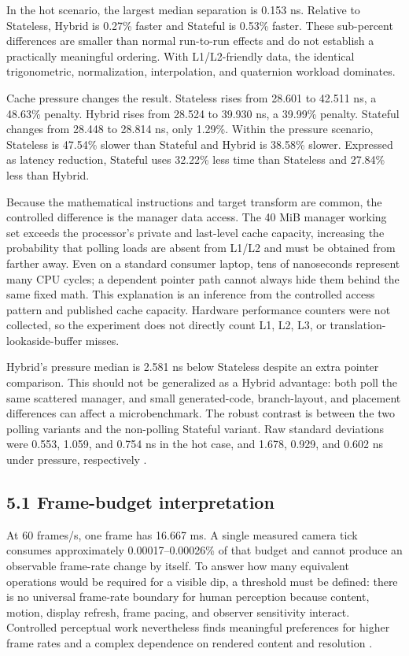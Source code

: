 In the hot scenario, the largest median separation is 0.153 ns. Relative to Stateless, Hybrid is 0.27\% faster and Stateful is 0.53\% faster. These sub-percent differences are smaller than normal run-to-run effects and do not establish a practically meaningful ordering. With L1/L2-friendly data, the identical trigonometric, normalization, interpolation, and quaternion workload dominates.

Cache pressure changes the result. Stateless rises from 28.601 to 42.511 ns, a 48.63\% penalty. Hybrid rises from 28.524 to 39.930 ns, a 39.99\% penalty. Stateful changes from 28.448 to 28.814 ns, only 1.29\%. Within the pressure scenario, Stateless is 47.54\% slower than Stateful and Hybrid is 38.58\% slower. Expressed as latency reduction, Stateful uses 32.22\% less time than Stateless and 27.84\% less than Hybrid.

Because the mathematical instructions and target transform are common, the controlled difference is the manager data access. The 40 MiB manager working set exceeds the processor's private and last-level cache capacity, increasing the probability that polling loads are absent from L1/L2 and must be obtained from farther away. Even on a standard consumer laptop, tens of nanoseconds represent many CPU cycles; a dependent pointer path cannot always hide them behind the same fixed math. This explanation is an inference from the controlled access pattern and published cache capacity. Hardware performance counters were not collected, so the experiment does not directly count L1, L2, L3, or translation-lookaside-buffer misses.

Hybrid's pressure median is 2.581 ns below Stateless despite an extra pointer comparison. This should not be generalized as a Hybrid advantage: both poll the same scattered manager, and small generated-code, branch-layout, and placement differences can affect a microbenchmark. The robust contrast is between the two polling variants and the non-polling Stateful variant. Raw standard deviations were 0.553, 1.059, and 0.754 ns in the hot case, and 1.678, 0.929, and 0.602 ns under pressure, respectively \cite{resultsartifact}.

\subsection{5.1 Frame-budget interpretation}

At 60 frames/s, one frame has 16.667 ms. A single measured camera tick consumes approximately 0.00017–0.00026\% of that budget and cannot produce an observable frame-rate change by itself. To answer how many equivalent operations would be required for a visible dip, a threshold must be defined: there is no universal frame-rate boundary for human perception because content, motion, display refresh, frame pacing, and observer sensitivity interact. Controlled perceptual work nevertheless finds meaningful preferences for higher frame rates and a complex dependence on rendered content and resolution \cite{debattista2017}.

